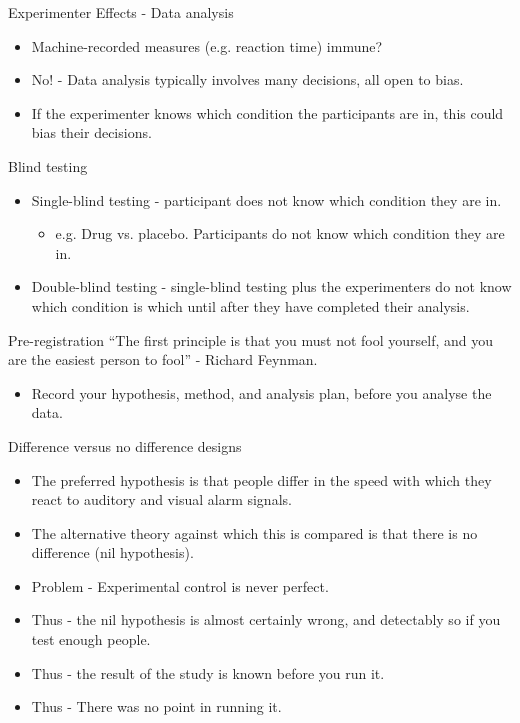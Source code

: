 \documentclass{beamer}
\begin{document}
\begin{frame}{Experimenter Effects - Data analysis  }
\begin{itemize}
\item Machine-recorded measures (e.g. reaction time) immune? 
\item No! - Data analysis typically involves many decisions, all open to bias. 
\item If the experimenter knows which condition the participants are in, this could bias their decisions.
\end{itemize}
\end{frame}

\begin{frame}{Blind testing}
\begin{itemize}
\item Single-blind testing - participant does not know which condition they are in. 
\begin{itemize}
\item e.g. Drug vs. placebo. Participants do not know which condition they are in. 
\end{itemize}
\item Double-blind testing - single-blind testing plus the experimenters do not know which condition is which until after they have completed their analysis.
\end{itemize}
\end{frame}

\begin{frame}{Pre-registration}
     ``The first principle is that you must not fool yourself, and you are the easiest person to fool'' - Richard Feynman.
\vspace{24pt}
  \begin{itemize}
  \item Record your hypothesis, method, and analysis plan, before you analyse the data.
\end{itemize}
\end{frame}


\begin{frame}{Difference versus no difference designs}
\begin{itemize}
\item The preferred hypothesis is that people differ in the speed with which they react to auditory and visual alarm signals.
\item The alternative theory against which this is compared is that there is no difference (nil hypothesis).
\item Problem - Experimental control is never perfect.
\item Thus - the nil hypothesis is almost certainly wrong, and detectably so if you test enough people.
\item Thus - the result of the study is known before you run it.
\item Thus - There was no point in running it.
\end{itemize}
\end{frame}
\end{document}
